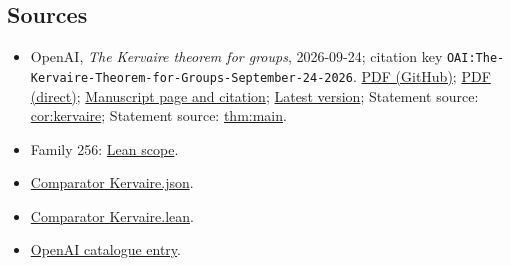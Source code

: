 \documentclass[11pt]{article}
\begin{document}
\subsection{Sources}
\begin{itemize}
\item OpenAI, \emph{The Kervaire theorem for groups}, 2026-09-24; citation key \texttt{OAI:The-Kervaire-Theorem-for-Groups-September-24-2026}. \href{https://github.com/openai/math/blob/adc7f1241b42e322a6451854ab7e4b4c146bf78a/preprints/The-Kervaire-Theorem-for-Groups-September-24-2026/The-Kervaire-Theorem-for-Groups-September-24-2026.pdf}{PDF (GitHub)}; \href{https://github.com/openai/math/raw/adc7f1241b42e322a6451854ab7e4b4c146bf78a/preprints/The-Kervaire-Theorem-for-Groups-September-24-2026/The-Kervaire-Theorem-for-Groups-September-24-2026.pdf}{PDF (direct)}; \href{https://github.com/openai/math/blob/adc7f1241b42e322a6451854ab7e4b4c146bf78a/preprints/The-Kervaire-Theorem-for-Groups-September-24-2026/README.md}{Manuscript page and citation}; \href{https://github.com/openai/math/blob/main/preprints/The-Kervaire-Theorem-for-Groups-September-24-2026/The-Kervaire-Theorem-for-Groups-September-24-2026.pdf}{Latest version}; Statement source: \href{https://github.com/openai/math/blob/adc7f1241b42e322a6451854ab7e4b4c146bf78a/preprints/The-Kervaire-Theorem-for-Groups-September-24-2026/build/sections/introduction.tex\#L36}{cor:kervaire}; Statement source: \href{https://github.com/openai/math/blob/adc7f1241b42e322a6451854ab7e4b4c146bf78a/preprints/The-Kervaire-Theorem-for-Groups-September-24-2026/build/sections/introduction.tex\#L23}{thm:main}.
\item Family 256: \href{https://github.com/openai/math/blob/adc7f1241b42e322a6451854ab7e4b4c146bf78a/lean/docs/256.md}{Lean scope}.
\item \href{https://github.com/openai/math/blob/adc7f1241b42e322a6451854ab7e4b4c146bf78a/lean/ComparatorChallenges/Kervaire.json}{Comparator Kervaire.json}.
\item \href{https://github.com/openai/math/blob/adc7f1241b42e322a6451854ab7e4b4c146bf78a/lean/ComparatorChallenges/Kervaire.lean}{Comparator Kervaire.lean}.
\item \href{https://github.com/openai/math/blob/adc7f1241b42e322a6451854ab7e4b4c146bf78a/CONTENTS.md}{OpenAI catalogue entry}.
\end{itemize}
\end{document}
